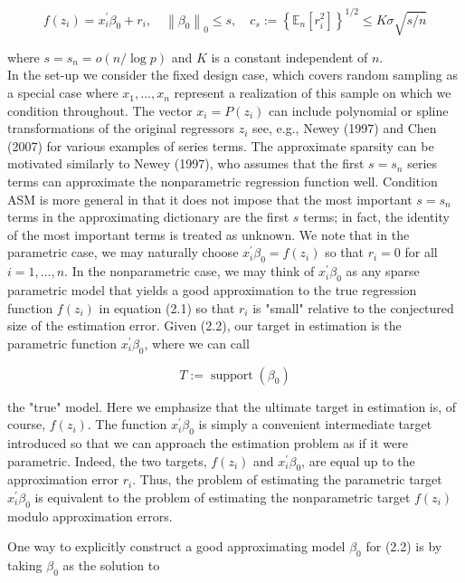 \documentclass[10pt]{article}
\begin{document}
\[
f\left(z_{i}\right)=x_{i}^{\prime} \beta_{0}+r_{i}, \quad\left\|\beta_{0}\right\|_{0} \leqslant s, \quad c_{s}:=\left\{\mathbb{E}_{n}\left[r_{i}^{2}\right]\right\}^{1 / 2} \leqslant K \sigma \sqrt{s / n}
\]

where \(s=s_{n}=o(n / \log p)\) and \(K\) is a constant independent of \(n\).\\
In the set-up we consider the fixed design case, which covers random sampling as a special case where \(x_{1}, \ldots, x_{n}\) represent a realization of this sample on which we condition throughout. The vector \(x_{i}=P\left(z_{i}\right)\) can include polynomial or spline transformations of the original regressors \(z_{i}\) see, e.g., Newey (1997) and Chen (2007) for various examples of series terms. The approximate sparsity can be motivated similarly to Newey (1997), who assumes that the first \(s=s_{n}\) series terms can approximate the nonparametric regression function well. Condition ASM is more general in that it does not impose that the most important \(s=s_{n}\) terms in the approximating dictionary are the first \(s\) terms; in fact, the identity of the most important terms is treated as unknown. We note that in the parametric case, we may naturally choose \(x_{i}^{\prime} \beta_{0}=f\left(z_{i}\right)\) so that \(r_{i}=0\) for all \(i=1, \ldots, n\). In the nonparametric case, we may think of \(x_{i}^{\prime} \beta_{0}\) as any sparse parametric model that yields a good approximation to the true regression function \(f\left(z_{i}\right)\) in equation (2.1) so that \(r_{i}\) is "small" relative to the conjectured size of the estimation error. Given (2.2), our target in estimation is the parametric function \(x_{i}^{\prime} \beta_{0}\), where we can call

\[
T:=\operatorname{support}\left(\beta_{0}\right)
\]

the "true" model. Here we emphasize that the ultimate target in estimation is, of course, \(f\left(z_{i}\right)\). The function \(x_{i}^{\prime} \beta_{0}\) is simply a convenient intermediate target introduced so that we can approach the estimation problem as if it were parametric. Indeed, the two targets, \(f\left(z_{i}\right)\) and \(x_{i}^{\prime} \beta_{0}\), are equal up to the approximation error \(r_{i}\). Thus, the problem of estimating the parametric target \(x_{i}^{\prime} \beta_{0}\) is equivalent to the problem of estimating the nonparametric target \(f\left(z_{i}\right)\) modulo approximation errors.

One way to explicitly construct a good approximating model \(\beta_{0}\) for (2.2) is by taking \(\beta_{0}\) as the solution to
\end{document}
